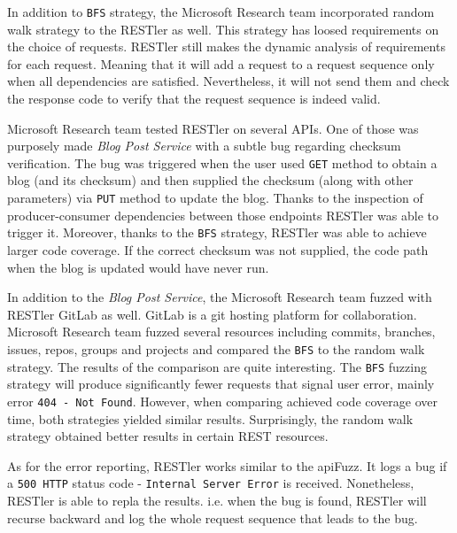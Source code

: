 In addition to \texttt{BFS} strategy, the Microsoft Research team incorporated random walk strategy to the RESTler as well. This strategy has loosed requirements on the choice of requests. RESTler still makes the dynamic analysis of requirements for each request. Meaning that it will add a request to a request sequence only when all dependencies are satisfied. Nevertheless, it will not send them and check the response code to verify that the request sequence is indeed valid.

Microsoft Research team tested RESTler on several APIs. One of those was purposely made \textit{Blog Post Service} with a subtle bug regarding checksum verification. The bug was triggered when the user used \texttt{GET} method to obtain a blog (and its checksum) and then supplied the checksum (along with other parameters) via \texttt{PUT} method to update the blog. Thanks to the inspection of producer-consumer dependencies between those endpoints RESTler was able to trigger it. Moreover, thanks to the \texttt{BFS} strategy, RESTler was able to achieve larger code coverage. If the correct checksum was not supplied, the code path when the blog is updated would have never run.

In addition to the \textit{Blog Post Service}, the Microsoft Research team fuzzed with RESTler GitLab as well. GitLab is a git hosting platform for collaboration. Microsoft Research team fuzzed several resources including commits, branches, issues, repos, groups and projects and compared the \texttt{BFS} to the random walk strategy. The results of the comparison are quite interesting. The \texttt{BFS} fuzzing strategy will produce significantly fewer requests that signal user error, mainly error \texttt{404 - Not Found}. However, when comparing achieved code coverage over time, both strategies yielded similar results. Surprisingly, the random walk strategy obtained better results in certain REST resources.

As for the error reporting, RESTler works similar to the apiFuzz. It logs a bug if a \texttt{500 HTTP} status code - \texttt{Internal Server Error} is received. Nonetheless, RESTler is able to repla the results. i.e. when the bug is found, RESTler will recurse backward and log the whole request sequence that leads to the bug.

